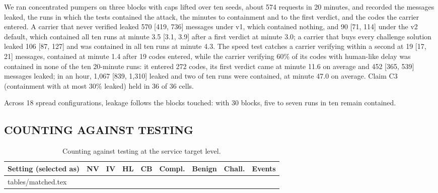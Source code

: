 \documentclass{IEEEoj}
\makeatletter
\newcommand{\tablerows}[1]{\@@input #1 }         %
\makeatother
\begin{document}
We ran concentrated pumpers on three blocks with caps lifted over ten seeds, about 574 requests in 20 minutes, and recorded the messages leaked, the runs in which the tests contained the attack, the minutes to containment and to the first verdict, and the codes the carrier entered. A carrier that never verified leaked 570 [419, 736] messages under v1, which contained nothing, and 90 [71, 114] under the v2 default, which contained all ten runs at minute 3.5 [3.1, 3.9] after a first verdict at minute 3.0; a carrier that buys every challenge solution leaked 106 [87, 127] and was contained in all ten runs at minute 4.3. The speed test catches a carrier verifying within a second at 19 [17, 21] messages, contained at minute 1.4 after 19 codes entered, while the carrier verifying 60\% of its codes with human-like delay was contained in none of the ten 20-minute runs: it entered 272 codes, its first verdict came at minute 11.6 on average and 452 [365, 539] messages leaked; in an hour, 1,067 [839, 1,310] leaked and two of ten runs were contained, at minute 47.0 on average. Claim C3 (containment with at most 30\% leaked) held in 36 of 36 cells.

Across 18 spread configurations, leakage follows the blocks touched: with 30 blocks, five to seven runs in ten remain contained.

\subsection{COUNTING AGAINST TESTING}
\label{sec:matched}

\begin{table}[!t]
\caption{Counting against testing at the service target level.}
\label{tab:matched}
\footnotesize
\begin{tabular*}{\textwidth}{@{\extracolsep{\fill}}lrrrrrrrr@{}}
\toprule
Setting (selected as) & NV & IV & HL & CB & Compl. & Benign & Chall. & Events \\
\midrule
\tablerows{tables/matched.tex}
\bottomrule
\end{tabular*}
\end{table}
\end{document}

